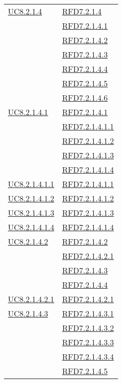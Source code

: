 \begin{longtable}{|>{\centering}m{5cm}|m{5cm}<{\centering}|}
\hyperref[UC8.2.1.4]{UC8.2.1.4} & \hyperlink{RFD7.2.1.4}{RFD7.2.1.4}\\
& \hyperlink{RFD7.2.1.4.1}{RFD7.2.1.4.1}\\
& \hyperlink{RFD7.2.1.4.2}{RFD7.2.1.4.2}\\
& \hyperlink{RFD7.2.1.4.3}{RFD7.2.1.4.3}\\
& \hyperlink{RFD7.2.1.4.4}{RFD7.2.1.4.4}\\
& \hyperlink{RFD7.2.1.4.5}{RFD7.2.1.4.5}\\
& \hyperlink{RFD7.2.1.4.6}{RFD7.2.1.4.6}\\ \hline
\hyperref[UC8.2.1.4.1]{UC8.2.1.4.1} & \hyperlink{RFD7.2.1.4.1}{RFD7.2.1.4.1}\\
& \hyperlink{RFD7.2.1.4.1.1}{RFD7.2.1.4.1.1}\\
& \hyperlink{RFD7.2.1.4.1.2}{RFD7.2.1.4.1.2}\\
& \hyperlink{RFD7.2.1.4.1.3}{RFD7.2.1.4.1.3}\\
& \hyperlink{RFD7.2.1.4.1.4}{RFD7.2.1.4.1.4}\\ \hline
\hyperref[UC8.2.1.4.1.1]{UC8.2.1.4.1.1} & \hyperlink{RFD7.2.1.4.1.1}{RFD7.2.1.4.1.1}\\ \hline
\hyperref[UC8.2.1.4.1.2]{UC8.2.1.4.1.2} & \hyperlink{RFD7.2.1.4.1.2}{RFD7.2.1.4.1.2}\\ \hline
\hyperref[UC8.2.1.4.1.3]{UC8.2.1.4.1.3} & \hyperlink{RFD7.2.1.4.1.3}{RFD7.2.1.4.1.3}\\ \hline
\hyperref[UC8.2.1.4.1.4]{UC8.2.1.4.1.4} & \hyperlink{RFD7.2.1.4.1.4}{RFD7.2.1.4.1.4}\\ \hline
\hyperref[UC8.2.1.4.2]{UC8.2.1.4.2} & \hyperlink{RFD7.2.1.4.2}{RFD7.2.1.4.2}\\
& \hyperlink{RFD7.2.1.4.2.1}{RFD7.2.1.4.2.1}\\
& \hyperlink{RFD7.2.1.4.3}{RFD7.2.1.4.3}\\
& \hyperlink{RFD7.2.1.4.4}{RFD7.2.1.4.4}\\ \hline
\hyperref[UC8.2.1.4.2.1]{UC8.2.1.4.2.1} & \hyperlink{RFD7.2.1.4.2.1}{RFD7.2.1.4.2.1}\\ \hline
\hyperref[UC8.2.1.4.3]{UC8.2.1.4.3} & \hyperlink{RFD7.2.1.4.3.1}{RFD7.2.1.4.3.1}\\
& \hyperlink{RFD7.2.1.4.3.2}{RFD7.2.1.4.3.2}\\
& \hyperlink{RFD7.2.1.4.3.3}{RFD7.2.1.4.3.3}\\
& \hyperlink{RFD7.2.1.4.3.4}{RFD7.2.1.4.3.4}\\
& \hyperlink{RFD7.2.1.4.5}{RFD7.2.1.4.5}\\ \hline

\end{longtable}
